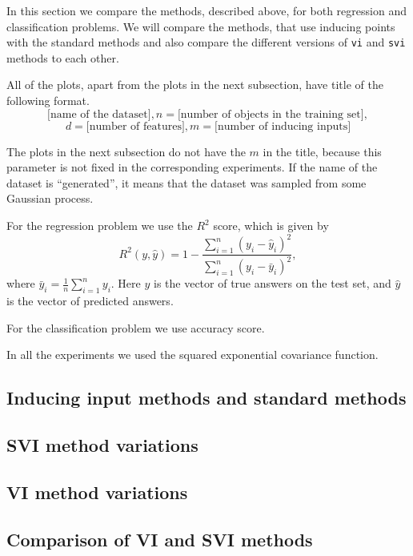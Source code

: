 In this section we compare the methods, described above, for both regression and classification problems. We will compare the methods, that use inducing points with the standard methods and also compare the different versions of \lstinline{vi} and \lstinline{svi} methods to each other.

All of the plots, apart from the plots in the next subsection, have title of the following format.
$$\mbox{[name of the dataset]}, n = \mbox{[number of objects in the training set]},$$
$$d = \mbox{[number of features]}, m = \mbox{[number of inducing inputs]}$$

The plots in the next subsection do not have the $m$ in the title, because this parameter is not fixed in the corresponding experiments. If the name of the dataset is ``generated'', it means that the dataset was sampled from some Gaussian process.

For the regression problem we use the $R^2$ score, which is given by
$$R^2(y, \hat y) = 1 - \frac{\sum_{i = 1}^{n} (y_i - \hat y_i)^2}{\sum_{i = 1}^{n} (y_i - \bar y_i)^2},$$
where $\bar y_i = \frac 1 n \sum_{i = 1}^n y_i$. Here $y$ is the vector of true answers on the test set, and $\hat y$ is the vector of predicted answers.

For the classification problem we use accuracy score.

In all the experiments we used the squared exponential covariance function. 

\subsection{Inducing input methods and standard methods}
	
\subsection{SVI method variations}
	
\subsection{VI method variations}
	
\subsection{Comparison of VI and SVI methods}
	
